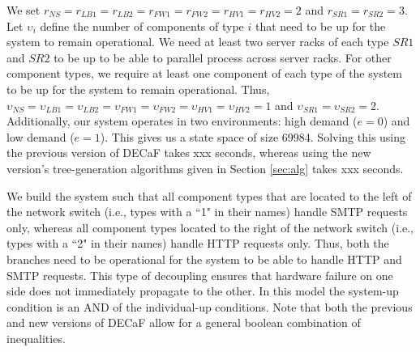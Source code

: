 \documentclass[12pt]{article}
\begin{document}
We set $r_{NS} = r_{LB1} = r_{LB2} = r_{FW1} = r_{FW2} = r_{HV1} = r_{HV2} =
2$ and $r_{SR1} = r_{SR2} = 3$. Let $\upsilon_i$ define the number of
components of type $i$ that need to be up for the system to remain
operational. We need at least two server racks of each type $SR1$ and $SR2$ to be
up to be able to parallel process across server racks. For other component
types, we require at least one component of each type of the system to be up
for the system to remain operational. Thus, $\upsilon_{NS} =
\upsilon_{LB1} = \upsilon_{LB2} = \upsilon_{FW1} = \upsilon_{FW2} =
\upsilon_{HV1} = \upsilon_{HV2} = 1$ and $\upsilon_{SR1} = \upsilon_{SR2} =
2$. Additionally, our system operates in two environments: high demand ($e =
0$) and low demand ($e = 1$). This gives us a state space of size 69984.
Solving this using the previous version of DECaF takes xxx
seconds, whereas using the new version's tree-generation algorithms given in
Section \ref{sec:alg} takes xxx seconds. 

We build the system such that all component types that are located to the left
of the network switch (i.e., types with a ``1" in their names) handle SMTP
requests only, whereas all component types located to the right of the network
switch (i.e., types with a ``2" in their names) handle HTTP requests only.
Thus, both the branches need to be operational for the system to be able to
handle HTTP and SMTP requests. This type of decoupling ensures that hardware
failure on one side does not immediately propagate to the other. In this model
the system-up condition is an AND of the individual-up conditions. Note that
both the previous and new versions of DECaF allow for a general boolean
combination of inequalities.
\end{document}
